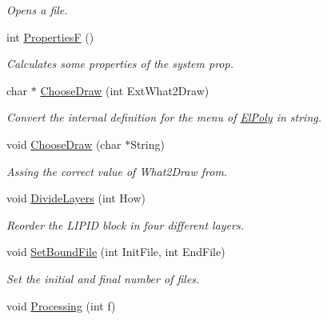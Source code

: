 \begin{DoxyCompactItemize}
\begin{DoxyCompactList}\small\item\em \-Opens a file. \end{DoxyCompactList}\item 
\hypertarget{classElPoly_ae41ade7fbfd977babf42a7e2e6b33f07}{int \hyperlink{classElPoly_ae41ade7fbfd977babf42a7e2e6b33f07}{\-Properties\-F} ()}\label{classElPoly_ae41ade7fbfd977babf42a7e2e6b33f07}

\begin{DoxyCompactList}\small\item\em \-Calculates some properties of the system  prop. \end{DoxyCompactList}\item 
\hypertarget{classElPoly_a86e52eb42d4ead5eb6b800ab1fd3a4d2}{char $\ast$ \hyperlink{classElPoly_a86e52eb42d4ead5eb6b800ab1fd3a4d2}{\-Choose\-Draw} (int \-Ext\-What2\-Draw)}\label{classElPoly_a86e52eb42d4ead5eb6b800ab1fd3a4d2}

\begin{DoxyCompactList}\small\item\em \-Convert the internal definition for the menu of \hyperlink{classElPoly}{\-El\-Poly} in string. \end{DoxyCompactList}\item 
void \hyperlink{classElPoly_aba70049e8fa7f7b845f9ccd8ad700015}{\-Choose\-Draw} (char $\ast$\-String)
\begin{DoxyCompactList}\small\item\em \-Assing the correct value of \-What2\-Draw from. \end{DoxyCompactList}\item 
\hypertarget{classElPoly_acffadf1cdc641927dfd8af49eebc2069}{void \hyperlink{classElPoly_acffadf1cdc641927dfd8af49eebc2069}{\-Divide\-Layers} (int \-How)}\label{classElPoly_acffadf1cdc641927dfd8af49eebc2069}

\begin{DoxyCompactList}\small\item\em \-Reorder the \-L\-I\-P\-I\-D block in four different layers. \end{DoxyCompactList}\item 
\hypertarget{classElPoly_a464eca35e2fcc5f03f9f8be8702f36cc}{void \hyperlink{classElPoly_a464eca35e2fcc5f03f9f8be8702f36cc}{\-Set\-Bound\-File} (int \-Init\-File, int \-End\-File)}\label{classElPoly_a464eca35e2fcc5f03f9f8be8702f36cc}

\begin{DoxyCompactList}\small\item\em \-Set the initial and final number of files. \end{DoxyCompactList}\item 
\hypertarget{classElPoly_a02045f98c00a6ef6af607bc27fc3e82a}{void \hyperlink{classElPoly_a02045f98c00a6ef6af607bc27fc3e82a}{\-Processing} (int f)}\label{classElPoly_a02045f98c00a6ef6af607bc27fc3e82a}


\end{DoxyCompactItemize}
